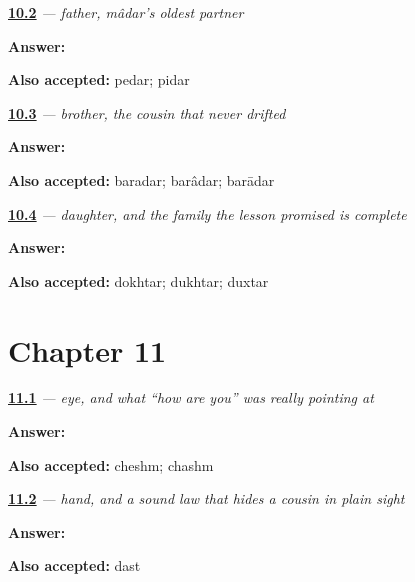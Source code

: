 \noindent\begin{minipage}[t]{\linewidth}
\raggedright
\hyperlink{review-FA-C10-pedar-meaning}{\textbf{10.2}} \emph{ — father, mâdar's oldest partner}\par
\small \textbf{Answer:} \par
\footnotesize \textbf{Also accepted:} pedar; pidar
\end{minipage}\par\medskip

\noindent\begin{minipage}[t]{\linewidth}
\raggedright
\hyperlink{review-FA-C10-baradar-meaning}{\textbf{10.3}} \emph{ — brother, the cousin that never drifted}\par
\small \textbf{Answer:} \par
\footnotesize \textbf{Also accepted:} baradar; barâdar; barādar
\end{minipage}\par\medskip

\noindent\begin{minipage}[t]{\linewidth}
\raggedright
\hyperlink{review-FA-C10-dokhtar-meaning}{\textbf{10.4}} \emph{ — daughter, and the family the  lesson promised is complete}\par
\small \textbf{Answer:} \par
\footnotesize \textbf{Also accepted:} dokhtar; dukhtar; duxtar
\end{minipage}\par\medskip

\section*{Chapter 11}

\noindent\begin{minipage}[t]{\linewidth}
\raggedright
\hyperlink{review-FA-C11-cheshm-meaning}{\textbf{11.1}} \emph{ — eye, and what \textquotedblleft{}how are you\textquotedblright{} was really pointing at}\par
\small \textbf{Answer:} \par
\footnotesize \textbf{Also accepted:} cheshm; chashm
\end{minipage}\par\medskip

\noindent\begin{minipage}[t]{\linewidth}
\raggedright
\hyperlink{review-FA-C11-dast-meaning}{\textbf{11.2}} \emph{ — hand, and a sound law that hides a cousin in plain sight}\par
\small \textbf{Answer:} \par
\footnotesize \textbf{Also accepted:} dast
\end{minipage}\par\medskip

